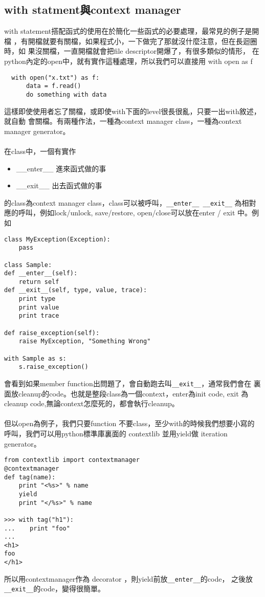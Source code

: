   \subsection{with statment與context manager}
  with statement搭配函式的使用在於簡化一些函式的必要處理，最常見的例子是開檔
  ，有開檔就要有關檔，如果程式小，一下做完了那就沒什麼注意，但在長迴圈時，如
  果沒關檔，一直開檔就會把file descriptor開爆了，有很多類似的情形，
  在python內定的open中，就有實作這種處理，所以我們可以直接用 with open as f
  \begin{verbatim}
  with open("x.txt") as f:
      data = f.read()
      do something with data
  \end{verbatim}
  這樣即使使用者忘了關檔，或即使with下面的level很長很亂，只要一出with敘述，就自動
  會關檔。有兩種作法，一種為context manager class，一種為context manager generator。
  \\\\
  在class中，一個有實作
  \begin{itemize}
    \item \_\_enter\_\_ 進來函式做的事
    \item \_\_exit\_\_ 出去函式做的事
  \end{itemize}
  的class為context manager class，class可以被呼叫，\verb=__enter__ __exit__=
  為相對應的呼叫，例如lock/unlock, save/restore, open/close可以放在enter / exit
  中。例如
  \begin{verbatim}
class MyException(Exception):
    pass

class Sample:
def __enter__(self):
    return self
def __exit__(self, type, value, trace):
    print type
    print value
    print trace

def raise_exception(self):
    raise MyException, "Something Wrong"

with Sample as s:
    s.raise_exception()
  \end{verbatim}
  會看到如果member function出問題了，會自動跑去叫\verb=__exit__=，通常我們會在
  裏面放cleanup的code。也就是整段class為一個context，enter為init code, exit
  為cleanup code,無論context怎麼死的，都會執行cleanup。
  \\\\
  但以open為例子，我們只要function 不要class，至少with的時候我們想要小寫的
  呼叫，我們可以用python標準庫裏面的 contextlib 並用yield做 iteration generator。
  \begin{verbatim}
from contextlib import contextmanager
@contextmanager
def tag(name):
    print "<%s>" % name
    yield
    print "</%s>" % name

>>> with tag("h1"):
...    print "foo"
...
<h1>
foo
</h1>
  \end{verbatim}
  所以用contextmanager作為 decorator ，則yield前放\verb=__enter__=的code，
  之後放\verb=__exit__=的code，變得很簡單。

